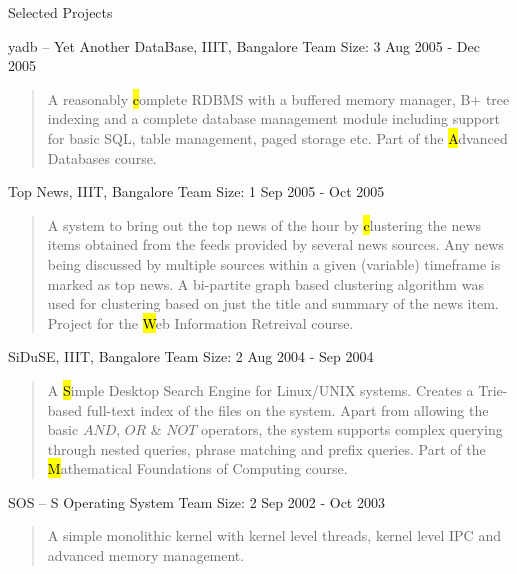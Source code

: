 \documentclass{resume}
\newcommand{\teamsize}{\hfill\sc\footnotesize Team Size: }
\begin{document}
\begin{category}{Selected Projects}{}
    \item {\topic yadb -- Yet Another DataBase,} IIIT, Bangalore
        {\teamsize 3}
        {\period Aug 2005 - Dec 2005}
        \begin{quote}
            A reasonably {\hl complete RDBMS} with a buffered memory manager,
            B+ tree indexing and a complete database management module
            including support for basic SQL, table management, paged storage
            etc. Part of the {\hl Advanced Databases} course.
        \end{quote}

    \item {\topic Top News,} IIIT, Bangalore
        {\teamsize 1}
        {\period Sep 2005 - Oct 2005}
        \begin{quote}
            A system to bring out the top news of the hour by {\hl clustering
            the news items} obtained from the feeds provided by several news
            sources. Any news being discussed by multiple sources within a
            given (variable) timeframe is marked as top news. A bi-partite
            graph based clustering algorithm was used for clustering based on
            just the title and summary of the news item. Project for the {\hl
            Web Information Retreival} course.
        \end{quote}

    \item {\topic SiDuSE,} IIIT, Bangalore
        {\teamsize 2}
        {\period Aug 2004 - Sep 2004}
        \begin{quote}
            A {\hl Simple Desktop Search Engine} for Linux/UNIX systems.
            Creates a Trie-based full-text index of the files on the system.
            Apart from allowing the basic $AND$, $OR$ \& $NOT$ operators, the
            system supports complex querying through nested queries, phrase
            matching and prefix queries. Part of the {\hl Mathematical
            Foundations of Computing} course.
        \end{quote}

    \item {\topic SOS -- S Operating System}
        {\teamsize 2}
        {\period Sep 2002 - Oct 2003}
        \begin{quote}
            A simple monolithic kernel with kernel level threads, kernel level
            IPC and advanced memory management.
        \end{quote}

\end{category}
\end{document}
